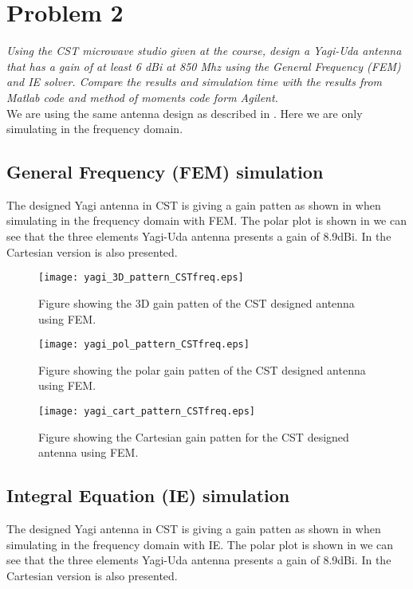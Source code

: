 \section{Problem 2}
\textit{Using the CST microwave studio given at the course, design a Yagi-Uda antenna that has a gain of at least 6 dBi at 850 Mhz using the General Frequency (FEM) and IE solver. Compare the results and simulation time with the results from Matlab code and method of moments code form Agilent.}\\

We are using the same antenna design as described in . Here we are only simulating in the frequency domain. 

\subsection{General Frequency (FEM) simulation}
The designed Yagi antenna in CST is giving a gain patten as shown in  when simulating in the frequency domain with FEM. The polar plot is shown in  we can see that the three elements Yagi-Uda antenna presents a gain of 8.9dBi. In  the Cartesian version is also presented.

\begin{figure}[!h]
  \centering
  \texttt{[image: yagi\_3D\_pattern\_CSTfreq.eps]}
  \caption{Figure showing the 3D gain patten of the CST designed antenna using FEM.}
  \label{fig:yagi_3D_pattern_CSTfreq}
\end{figure}

\begin{figure}[!h]
  \centering
  \texttt{[image: yagi\_pol\_pattern\_CSTfreq.eps]}
  \caption{Figure showing the polar gain patten of the CST designed antenna using FEM.}
  \label{fig:yagi_pol_pattern_CSTfreq}
\end{figure}

\begin{figure}[!h]
  \centering
  \texttt{[image: yagi\_cart\_pattern\_CSTfreq.eps]}
  \caption{Figure showing the Cartesian gain patten for the CST designed antenna using FEM.}
  \label{fig:yagi_cart_pattern_CSTfreq}
\end{figure}

\subsection{Integral Equation (IE) simulation}
The designed Yagi antenna in CST is giving a gain patten as shown in  when simulating in the frequency domain with IE. The polar plot is shown in  we can see that the three elements Yagi-Uda antenna presents a gain of 8.9dBi. In  the Cartesian version is also presented.

